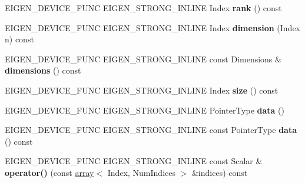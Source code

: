 \begin{DoxyCompactItemize}
\item 
\mbox{\label{class_eigen_1_1_tensor_map_a074e32d5b247cb96189660b0cc35d0cc}} 
E\+I\+G\+E\+N\+\_\+\+D\+E\+V\+I\+C\+E\+\_\+\+F\+U\+NC E\+I\+G\+E\+N\+\_\+\+S\+T\+R\+O\+N\+G\+\_\+\+I\+N\+L\+I\+NE Index {\bfseries rank} () const
\item 
\mbox{\label{class_eigen_1_1_tensor_map_adfb930b8289836aad40d64171bde46a1}} 
E\+I\+G\+E\+N\+\_\+\+D\+E\+V\+I\+C\+E\+\_\+\+F\+U\+NC E\+I\+G\+E\+N\+\_\+\+S\+T\+R\+O\+N\+G\+\_\+\+I\+N\+L\+I\+NE Index {\bfseries dimension} (Index n) const
\item 
\mbox{\label{class_eigen_1_1_tensor_map_adf190cbdc86c4759126b3ab2478c7087}} 
E\+I\+G\+E\+N\+\_\+\+D\+E\+V\+I\+C\+E\+\_\+\+F\+U\+NC E\+I\+G\+E\+N\+\_\+\+S\+T\+R\+O\+N\+G\+\_\+\+I\+N\+L\+I\+NE const Dimensions \& {\bfseries dimensions} () const
\item 
\mbox{\label{class_eigen_1_1_tensor_map_a715f830bbfa94beb8b2deb053530afd6}} 
E\+I\+G\+E\+N\+\_\+\+D\+E\+V\+I\+C\+E\+\_\+\+F\+U\+NC E\+I\+G\+E\+N\+\_\+\+S\+T\+R\+O\+N\+G\+\_\+\+I\+N\+L\+I\+NE Index {\bfseries size} () const
\item 
\mbox{\label{class_eigen_1_1_tensor_map_a7f70d6785756de46ed4fd5ba9afc5dd7}} 
E\+I\+G\+E\+N\+\_\+\+D\+E\+V\+I\+C\+E\+\_\+\+F\+U\+NC E\+I\+G\+E\+N\+\_\+\+S\+T\+R\+O\+N\+G\+\_\+\+I\+N\+L\+I\+NE Pointer\+Type {\bfseries data} ()
\item 
\mbox{\label{class_eigen_1_1_tensor_map_aec1b7d600b4a9a6588b1a0a00a63b135}} 
E\+I\+G\+E\+N\+\_\+\+D\+E\+V\+I\+C\+E\+\_\+\+F\+U\+NC E\+I\+G\+E\+N\+\_\+\+S\+T\+R\+O\+N\+G\+\_\+\+I\+N\+L\+I\+NE const Pointer\+Type {\bfseries data} () const
\item 
\mbox{\label{class_eigen_1_1_tensor_map_a84de83b9ed853382c8b6e1a92f1d6771}} 
E\+I\+G\+E\+N\+\_\+\+D\+E\+V\+I\+C\+E\+\_\+\+F\+U\+NC E\+I\+G\+E\+N\+\_\+\+S\+T\+R\+O\+N\+G\+\_\+\+I\+N\+L\+I\+NE const Scalar \& {\bfseries operator()} (const \hyperlink{class_eigen_1_1array}{array}$<$ Index, Num\+Indices $>$ \&indices) const
\item 

\end{DoxyCompactItemize}

